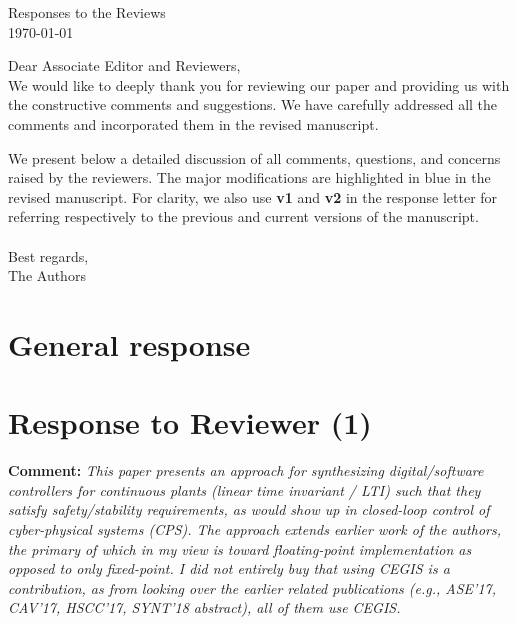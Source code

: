 \documentclass{article}
\newcommand{\vold}[1]{\colorbox{red!20}{\bfseries #1}}
\newcommand{\vnew}[1]{\colorbox{blue!30}{\bfseries #1}}
\begin{document}
\begin{center}
{\Large Responses to the Reviews}\\\vspace{0.3cm}
\today
\end{center}
\vspace{1cm}
Dear Associate Editor and Reviewers,\vspace{0.3cm}
\\
We would like to deeply thank you for reviewing our paper and providing us with the constructive comments and suggestions. We have carefully addressed
all the comments and incorporated them in the revised manuscript.

We present below a detailed discussion of all comments, questions, and concerns raised by the reviewers. The major modifications are highlighted in
blue in the revised manuscript. 
 For clarity,  we also use \vold{v1} and \vnew{v2} in the response letter for referring respectively to the previous
and current versions of the manuscript.
\\
\\
Best regards,\vspace{0.1cm}
\\
The Authors
%
\newpage

\section{General response}




\section{Response to Reviewer (1)}
\bigskip

{\bf Comment: }{\itshape This paper presents an approach for synthesizing 
digital/software controllers for continuous plants (linear time invariant / LTI) 
such that they satisfy safety/stability requirements, as would show up in closed-loop 
control of cyber-physical systems (CPS). The approach extends earlier work of the authors, 
the primary of which in my view is toward floating-point implementation as opposed to only fixed-point. 
I did not entirely buy that using CEGIS is a contribution, as from looking over the earlier related publications 
(e.g., ASE'17, CAV'17, HSCC'17, SYNT'18 abstract), all of them use CEGIS.}

\vspace{1em}
\end{document}
